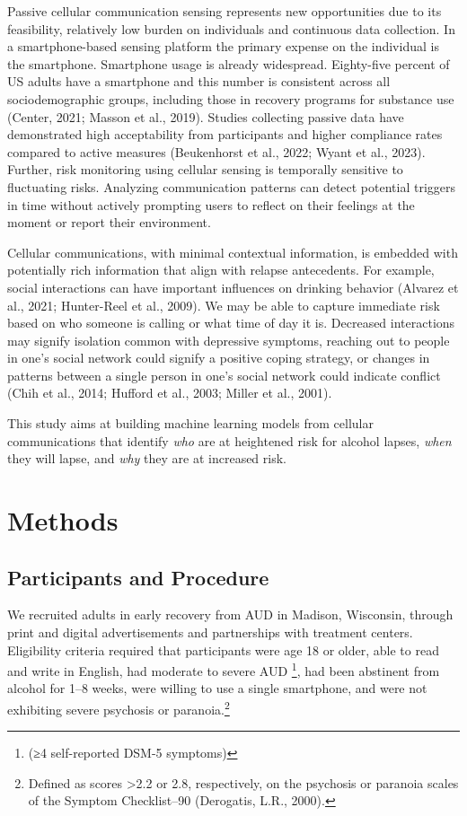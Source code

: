 \documentclass[
  letterpaper,
  DIV=11,
  numbers=noendperiod]{scrartcl}
\begin{document}
Passive cellular communication sensing represents new opportunities due
to its feasibility, relatively low burden on individuals and continuous
data collection. In a smartphone-based sensing platform the primary
expense on the individual is the smartphone. Smartphone usage is already
widespread. Eighty-five percent of US adults have a smartphone and this
number is consistent across all sociodemographic groups, including those
in recovery programs for substance use (Center, 2021; Masson et al.,
2019). Studies collecting passive data have demonstrated high
acceptability from participants and higher compliance rates compared to
active measures (Beukenhorst et al., 2022; Wyant et al., 2023). Further,
risk monitoring using cellular sensing is temporally sensitive to
fluctuating risks. Analyzing communication patterns can detect potential
triggers in time without actively prompting users to reflect on their
feelings at the moment or report their environment.

Cellular communications, with minimal contextual information, is
embedded with potentially rich information that align with relapse
antecedents. For example, social interactions can have important
influences on drinking behavior (Alvarez et al., 2021; Hunter-Reel et
al., 2009). We may be able to capture immediate risk based on who
someone is calling or what time of day it is. Decreased interactions may
signify isolation common with depressive symptoms, reaching out to
people in one's social network could signify a positive coping strategy,
or changes in patterns between a single person in one's social network
could indicate conflict (Chih et al., 2014; Hufford et al., 2003; Miller
et al., 2001).

This study aims at building machine learning models from cellular
communications that identify \emph{who} are at heightened risk for
alcohol lapses, \emph{when} they will lapse, and \emph{why} they are at
increased risk.

\section{Methods}\label{methods}

\subsection{Participants and
Procedure}\label{participants-and-procedure}

We recruited adults in early recovery from AUD in Madison, Wisconsin,
through print and digital advertisements and partnerships with treatment
centers. Eligibility criteria required that participants were age 18 or
older, able to read and write in English, had moderate to severe AUD
\footnote{(≥4 self-reported DSM-5 symptoms)}, had been abstinent from
alcohol for 1--8 weeks, were willing to use a single smartphone, and
were not exhibiting severe psychosis or paranoia.\footnote{Defined as
  scores \textgreater2.2 or 2.8, respectively, on the psychosis or
  paranoia scales of the Symptom Checklist--90 (Derogatis, L.R., 2000).}
\end{document}
